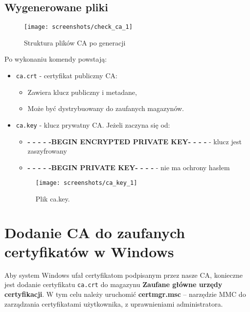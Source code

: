 \documentclass{article}
\begin{document}
\subsection{Wygenerowane pliki}
\begin{figure}[H]
    \centering
    \texttt{[image: screenshots/check\_ca\_1]}
    \caption{Struktura plików CA po generacji}
    \label{fig:ca_files}
\end{figure}
Po wykonaniu komendy powstają: \\
\begin{itemize}
    \item \texttt{ca.crt} - certyfikat publiczny CA:
    \begin{itemize}
        \item Zawiera klucz publiczny i metadane,
        \item Może być dystrybuowany do zaufanych magazynów. \\
    \end{itemize}
    \item \texttt{ca.key} - klucz prywatny CA. 
Jeżeli zaczyna się od:
\begin{itemize}
\item \textbf{- - - - -BEGIN ENCRYPTED PRIVATE KEY- - - -} - klucz jest zaszyfrowany
\item \textbf{- - - - -BEGIN PRIVATE KEY- - - -} - nie ma ochrony hasłem
\end{itemize}

    \begin{figure}[H]
             \centering
                \texttt{[image: screenshots/ca\_key\_1]}
            \caption{Plik ca.key.}
        \label{fig:ca_files}
    \end{figure}
    

\end{itemize}


\section{Dodanie CA do zaufanych certyfikatów w Windows}
Aby system Windows ufał certyfikatom podpisanym przez nasze CA, konieczne jest dodanie certyfikatu \texttt{ca.crt} do magazynu \textbf{Zaufane główne urzędy certyfikacji}. 
W tym celu należy uruchomić \textbf{certmgr.msc} – narzędzie MMC do zarządzania certyfikatami użytkownika, z uprawnieniami administratora.
\end{document}
